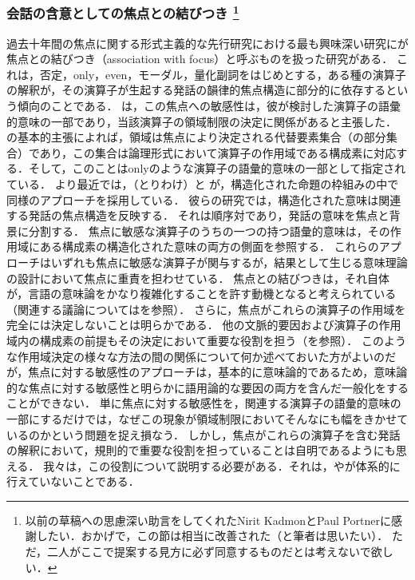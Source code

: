 \documentclass{goken}
\newcommand{\term}[2]{\textsf{#1}（#2）}
\newcommand{\ori}[1]{\noindent\textcolor[gray]{0.7}{\fontsize{8pt}{8pt}\selectfont{\textsf{(p.~#1)}}} }
\begin{document}
\subsubsection[会話の含意としての焦点との結びつき]{会話の含意としての焦点との結びつき%
\footnote{%
	以前の草稿への思慮深い助言をしてくれた\textmd{Nirit Kadmon}と\textmd{Paul Portner}に感謝したい．おかげで，この節は相当に改善された（と筆者は思いたい）．%
  ただ，二人がここで提案する見方に必ず同意するものだとは考えないで欲しい．
}
}\label{sec:2.2.1}

過去十年間の焦点に関する形式主義的な先行研究における最も興味深い研究に\citet{Jackendoff1972}が\term{焦点との結びつき}{association with focus}と呼ぶものを扱った研究がある．
これは，否定，only，even，モーダル，量化副詞をはじめとする，ある種の演算子の解釈が，その演算子が生起する発話の韻律的焦点構造に部分的に依存するという傾向のことである．
\citet{Rooth1985}は，この焦点への敏感性は，彼が検討した演算子の語彙的意味の一部であり，当該演算子の領域制限の決定に関係があると主張した．
\citeauthor{Rooth1985}の基本的主張によれば，領域は焦点により決定される代替要素集合（の部分集合）であり，この集合は論理形式において演算子の作用域である構成素に対応する．そして，このことはonlyのような演算子の語彙的意味の一部として指定されている．
より最近では，（とりわけ）\citealt{vonStechow1991}と\ori{37}\citealt{Krifka1992}が，構造化された命題の枠組みの中で同様のアプローチを採用している．
彼らの研究では，構造化された意味は関連する発話の焦点構造を反映する．
それは順序対であり，発話の意味を焦点と背景に分割する．
焦点に敏感な演算子のうちの一つの持つ語彙的意味は，その作用域にある構成素の構造化された意味の両方の側面を参照する．
これらのアプローチはいずれも焦点に敏感な演算子が関与するが，結果として生じる意味理論の設計において焦点に重責を担わせている．
焦点との結びつきは，それ自体が，言語の意味論をかなり複雑化することを許す動機となると考えられている（関連する議論については\citealt{Rooth1996}を参照）．
さらに，焦点がこれらの演算子の作用域を完全には決定しないことは明らかである．
他の文脈的要因および演算子の作用域内の構成素の前提もその決定において重要な役割を担う（\citealt{Roberts1995}を参照）．
このような作用域決定の様々な方法の間の関係について何か述べておいた方がよいのだが，焦点に対する敏感性のアプローチは，基本的に意味論的であるため，意味論的な焦点に対する敏感性と明らかに語用論的な要因の両方を含んだ一般化をすることができない．
単に焦点に対する敏感性を，関連する演算子の語彙的意味の一部にするだけでは，なぜこの現象が領域制限においてそんなにも幅をきかせているのかという問題を捉え損なう．
しかし，焦点がこれらの演算子を含む発話の解釈において，規則的で重要な役割を担っていることは自明であるようにも思える．
我々は，この役割について説明する必要がある．それは，\citet{Vallduvi1993}や\citet{VallduviZacharski1994}が体系的に行えていないことである．
\end{document}
